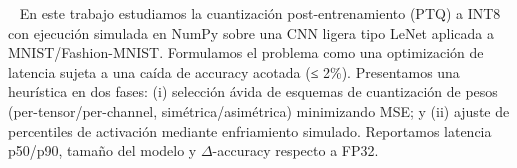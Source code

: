 \
        En este trabajo estudiamos la cuantización post-entrenamiento (PTQ) a INT8
        con ejecución simulada en NumPy sobre una CNN ligera tipo LeNet aplicada a MNIST/Fashion-MNIST.
        Formulamos el problema como una optimización de latencia sujeta a una caída de accuracy
        acotada (≤ 2\%). Presentamos una heurística en dos fases: (i) selección ávida de
        esquemas de cuantización de pesos (per-tensor/per-channel, simétrica/asimétrica) minimizando MSE;
        y (ii) ajuste de percentiles de activación mediante enfriamiento simulado.
        Reportamos latencia p50/p90, tamaño del modelo y $\Delta$-accuracy respecto a FP32.
